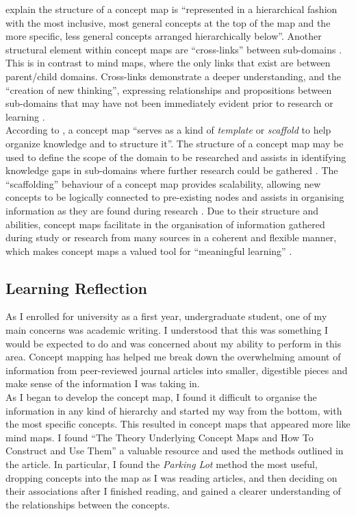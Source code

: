 \documentclass[12pt,a4paper]{report}
\begin{document}
\citet[p. 1]{Novak2006} explain the structure of a concept map is ``represented in a hierarchical fashion with the most inclusive, most general concepts at the top of the map and the more specific, less general concepts arranged hierarchically below''. Another structural element within concept maps are ``cross-links'' between sub-domains \citep[p. 1]{Novak2006}. This is in contrast to mind maps, where the only links that exist are between parent/child domains. Cross-links demonstrate a deeper understanding, and the ``creation of new thinking'', expressing relationships and propositions between sub-domains that may have not been immediately evident prior to research or learning \citep[p. 1]{Novak2006}.\\

According to \citet[p. 1]{Novak2006}, a concept map ``serves as a kind of \emph{template} or \emph{scaffold} to help organize knowledge and to structure it''. The structure of a concept map may be used to define the scope of the domain to be researched and assists in identifying knowledge gaps in sub-domains where further research could be gathered \citep{Novak2006}. The ``scaffolding'' behaviour of a concept map provides scalability, allowing new concepts to be logically connected to pre-existing nodes and assists in organising information as they are found during research \citep{Novak2006}. Due to their structure and abilities, concept maps facilitate in the organisation of information gathered during study or research from many sources in a coherent and flexible manner, which makes concept maps a valued tool for ``meaningful learning'' \citep[p. 1]{Novak2006}.

\newpage
\subsection*{\textsf{Learning Reflection}}
As I enrolled for university as a first year, undergraduate student, one of my main concerns was academic writing. I understood that this was something I would be expected to do and was concerned about my ability to perform in this area. Concept mapping has helped me break down the overwhelming amount of information from peer-reviewed journal articles into smaller, digestible pieces and make sense of the information I was taking in.\\

As I began to develop the concept map, I found it difficult to organise the information in any kind of hierarchy and started my way from the bottom, with the most specific concepts. This resulted in concept maps that appeared more like mind maps. I found \citet{Novak2006} ``The Theory Underlying Concept Maps and How To Construct and Use Them'' a valuable resource and used the methods outlined in the article. In particular, I found the \emph{Parking Lot} method the most useful, dropping concepts into the map as I was reading articles, and then deciding on their associations after I finished reading, and gained a clearer understanding of the relationships between the concepts.\\
\end{document}
